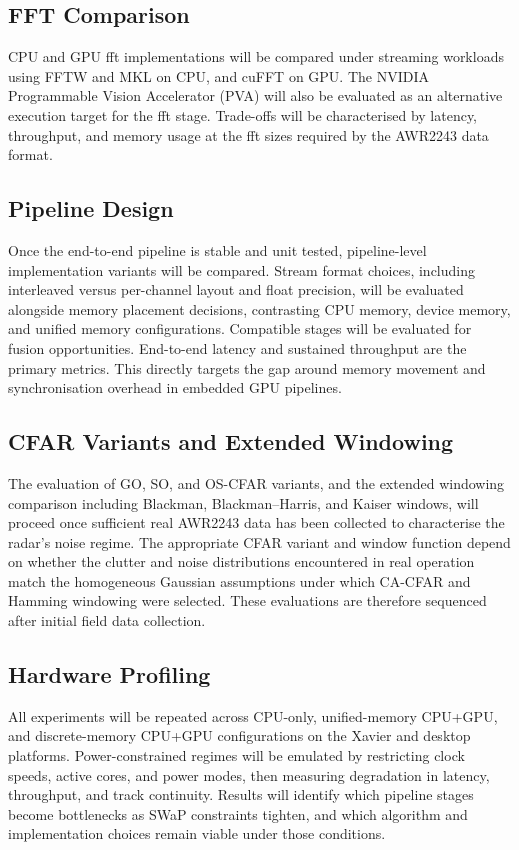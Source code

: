 \subsection{FFT Comparison}
CPU and GPU \gls{fft} implementations will be compared under streaming workloads using FFTW and MKL on CPU, and cuFFT on GPU. The NVIDIA Programmable Vision Accelerator (PVA) will also be evaluated as an alternative execution target for the \gls{fft} stage. Trade-offs will be characterised by latency, throughput, and memory usage at the \gls{fft} sizes required by the AWR2243 data format.
\subsection{Pipeline Design}
Once the end-to-end pipeline is stable and unit tested, pipeline-level implementation variants will be compared. Stream format choices, including interleaved versus per-channel layout and float precision, will be evaluated alongside memory placement decisions, contrasting CPU memory, device memory, and unified memory configurations. Compatible stages will be evaluated for fusion opportunities. End-to-end latency and sustained throughput are the primary metrics. This directly targets the gap around memory movement and synchronisation overhead in embedded GPU pipelines.
\subsection{CFAR Variants and Extended Windowing}
The evaluation of GO, SO, and OS-CFAR variants, and the extended windowing comparison including Blackman, Blackman--Harris, and Kaiser windows, will proceed once sufficient real AWR2243 data has been collected to characterise the radar's noise regime. The appropriate CFAR variant and window function depend on whether the clutter and noise distributions encountered in real operation match the homogeneous Gaussian assumptions under which CA-CFAR and Hamming windowing were selected. These evaluations are therefore sequenced after initial field data collection.
\subsection{Hardware Profiling}
All experiments will be repeated across CPU-only, unified-memory CPU+GPU, and discrete-memory CPU+GPU configurations on the Xavier and desktop platforms. Power-constrained regimes will be emulated by restricting clock speeds, active cores, and power modes, then measuring degradation in latency, throughput, and track continuity. Results will identify which pipeline stages become bottlenecks as SWaP constraints tighten, and which algorithm and implementation choices remain viable under those conditions.
